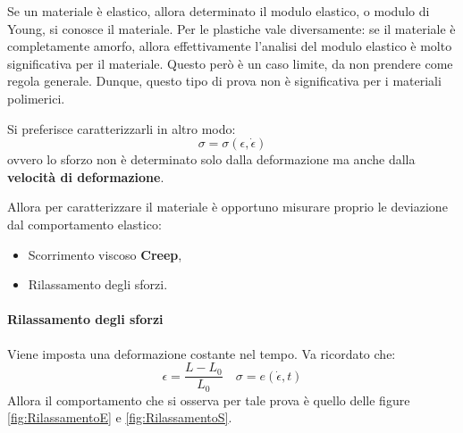 Se un materiale è elastico, allora determinato il modulo elastico, o modulo di Young, si conosce il materiale.
Per le plastiche vale diversamente: se il materiale è completamente amorfo, allora effettivamente l'analisi del modulo elastico è molto significativa per il materiale. Questo però è un caso limite, da non prendere come regola generale.
Dunque, questo tipo di prova non è significativa per i materiali polimerici.

Si preferisce caratterizzarli in altro modo:
\begin{equation}
\sigma = \sigma(\epsilon,\dot{\epsilon})
\end{equation}
ovvero lo sforzo non è determinato solo dalla deformazione ma anche dalla \textbf{velocità di deformazione}.

Allora per caratterizzare il materiale è opportuno misurare proprio le deviazione dal comportamento elastico:
\begin{itemize}
\item Scorrimento viscoso \textbf{Creep},
\item Rilassamento degli sforzi.
\end{itemize}

\paragraph{Rilassamento degli sforzi}
Viene imposta una deformazione costante nel tempo.
Va ricordato che:
\begin{equation}
\epsilon = \frac{L - L_0}{L_0} \quad	\sigma = e(\dot{\epsilon},t)
\end{equation}
Allora il comportamento che si osserva per tale prova è quello delle figure \ref{fig:RilassamentoE} e \ref{fig:RilassamentoS}.

